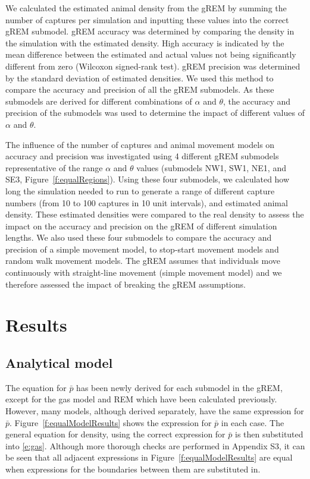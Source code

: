 \documentclass[a4paper,10pt,reqno,oneside]{amsart}
\begin{document}
We calculated the estimated animal density from the gREM by summing the number of captures per simulation and inputting these values into the correct gREM submodel. gREM accuracy was determined by comparing the density in the simulation with the estimated density. High accuracy is indicated by the mean difference between the estimated and actual values not being significantly different from zero (Wilcoxon signed-rank test). gREM precision was determined by the standard deviation of estimated densities. We used this method to compare the accuracy and precision of all the gREM submodels. As these submodels are derived for different combinations of $\alpha$ and $\theta$, the accuracy and precision of the submodels was used to determine the impact of different values of $\alpha$ and $\theta$. 

The influence of the number of captures and animal movement models on accuracy and precision was investigated using 4 different gREM submodels representative of the range $\alpha$ and $\theta$ values (submodels NW1, SW1, NE1, and SE3, Figure~\ref{f:equalRegions}). Using these four submodels, we calculated how long the simulation needed to run to generate a range of different capture numbers (from 10 to 100 captures in 10 unit intervals), and estimated animal density. These estimated densities were compared to the real density to assess the impact on the accuracy and precision on the gREM of different simulation lengths. We also used these four submodels to compare the accuracy and precision of a simple movement model, to stop-start movement models and random walk movement models. The gREM assumes that individuals move continuously with straight-line movement (simple movement model) and we therefore assessed the impact of breaking the gREM assumptions. 


\section{Results}

\subsection{Analytical model}

The equation for $\bar{p}$ has been newly derived for each submodel in the gREM, except for the gas model and REM which have been calculated previously. However, many models, although derived separately, have the same expression for $\bar{p}$. Figure~\ref{f:equalModelResults} shows the expression for $\bar{p}$ in each case. The general equation for density, using the correct expression for $\bar{p}$ is then substituted into \ref{e:gas}. Although more thorough checks are performed in Appendix S3, it can be seen that all adjacent expressions in Figure~\ref{f:equalModelResults} are equal when expressions for the boundaries between them are substituted in.
\end{document}
